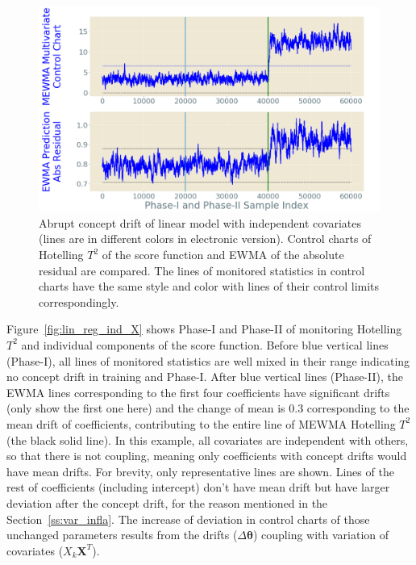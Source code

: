\documentclass[twoside,11pt]{article}
\begin{document}
\begin{enumerate}[(I)]
\begin{figure}[!htp]
\centering
\includegraphics[width = 0.6\linewidth]{../figures/v14/sim_2/reg/3_sim2_lin_1e-08_0_005_1.png}
  \caption{Abrupt concept drift of linear model with independent covariates (lines are in different colors in electronic version). Control charts of Hotelling $T^2$ of the score function and EWMA of the absolute residual are compared. The lines of monitored statistics in control charts have the same style and color with lines of their control limits correspondingly.}
  \label{fig:lin_reg_ind_X_comp}
\end{figure}

Figure~\ref{fig:lin_reg_ind_X} shows Phase-I and Phase-II of monitoring Hotelling $T^2$ and individual components of the score function. Before blue vertical lines (Phase-I), all lines of monitored statistics are well mixed in their range indicating no concept drift in training and Phase-I. After blue vertical lines (Phase-II), the EWMA lines corresponding to the first four coefficients have significant drifts (only show the first one here) and the change of mean is $0.3$ corresponding to the mean drift of coefficients, contributing to the entire line of MEWMA Hotelling $T^2$ (the black solid line). In this example, all covariates are independent with others, so that there is not coupling, meaning only coefficients with concept drifts would have mean drifts. For brevity, only representative lines are shown. Lines of the rest of coefficients (including intercept) don't have mean drift but have larger deviation after the concept drift, for the reason mentioned in the Section~\ref{ss:var_infla}. The increase of deviation in control charts of those unchanged parameters results from the drifts ($\Delta \bm { \theta}$) coupling with variation of covariates ($X_k\bm {X}^T$).


\end{enumerate}
\end{document}

